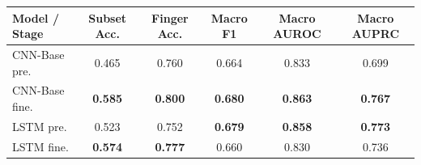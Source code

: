 \begin{tabular}{lccccc}
\toprule
Model / Stage & Subset Acc. & Finger Acc. & Macro F1 & Macro AUROC & Macro AUPRC \\
\midrule
CNN-Base pre. & 0.465 & 0.760 & 0.664 & 0.833 & 0.699 \\
CNN-Base fine. & \textbf{0.585} & \textbf{0.800} & \textbf{0.680} & \textbf{0.863} & \textbf{0.767} \\
LSTM pre. & 0.523 & 0.752 & \textbf{0.679} & \textbf{0.858} & \textbf{0.773} \\
LSTM fine. & \textbf{0.574} & \textbf{0.777} & 0.660 & 0.830 & 0.736 \\
\bottomrule
\end{tabular}
